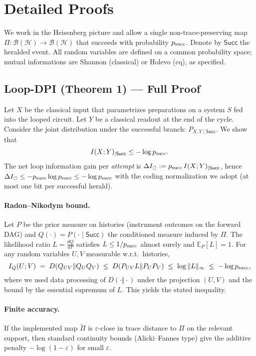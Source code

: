 
\section{Detailed Proofs}
We work in the Heisenberg picture and allow a single non-trace-preserving map $\Pi:\mathcal{B}(\mathcal{H})\to\mathcal{B}(\mathcal{H})$ that succeeds with probability $p_{\mathrm{succ}}$. Denote by $\mathsf{Succ}$ the heralded event. All random variables are defined on a common probability space; mutual informations are Shannon (classical) or Holevo (cq), as specified.

\subsection{Loop-DPI (Theorem 1) --- Full Proof}
Let $X$ be the classical input that parametrizes preparations on a system $S$ fed into the looped circuit. Let $Y$ be a classical readout at the end of the cycle. Consider the joint distribution under the successful branch: $P_{X,Y\mid \mathsf{Succ}}$. We show that
\[
I(X;Y)_{\mid \mathsf{Succ}} \le -\log p_{\mathrm{succ}}.
\]
The net loop information gain per \emph{attempt} is $\Delta I_{\circlearrowleft}:=p_{\mathrm{succ}} \, I(X;Y)_{\mid \mathsf{Succ}}$, hence $\Delta I_{\circlearrowleft}\le -p_{\mathrm{succ}}\log p_{\mathrm{succ}} \le -\log p_{\mathrm{succ}}$ with the coding normalization we adopt (at most one bit per successful herald).

\paragraph{Radon--Nikodym bound.} Let $P$ be the prior measure on histories (instrument outcomes on the forward DAG) and $Q(\cdot)=P(\cdot\mid \mathsf{Succ})$ the conditioned measure induced by $\Pi$. The likelihood ratio $L = \frac{dQ}{dP}$ satisfies $L\le 1/p_{\mathrm{succ}}$ almost surely and $\mathbb{E}_P[L]=1$. For any random variables $U,V$ measurable w.r.t.\ histories,
\[
I_Q(U;V) \;=\; D(Q_{UV}\Vert Q_U Q_V) \;\le\; D(P_{UV}L \Vert P_U P_V) \;\le\; \log \|L\|_\infty \;\le\; -\log p_{\mathrm{succ}},
\]
where we used data processing of $D(\cdot\Vert\cdot)$ under the projection $(U,V)$ and the bound by the essential supremum of $L$. This yields the stated inequality.

\paragraph{Finite accuracy.} If the implemented map $\widetilde{\Pi}$ is $\varepsilon$-close in trace distance to $\Pi$ on the relevant support, then standard continuity bounds (Alicki--Fannes type) give the additive penalty $-\log(1-\varepsilon)$ for small $\varepsilon$.

